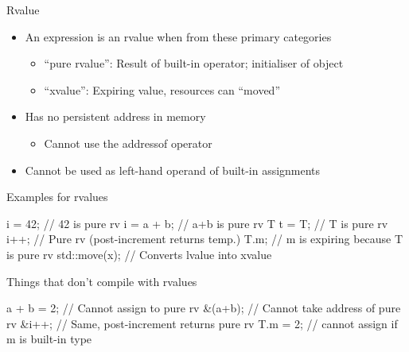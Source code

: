 \begin{frame}[fragile]
  \begin{block}{Rvalue}
    \begin{itemize}
      \item An expression is an rvalue when from these primary categories
      \begin{itemize}
        \item ``pure rvalue'': Result of built-in operator; initialiser of object
        \item ``xvalue'': Expiring value, resources can ``moved''
      \end{itemize}
      \item Has no persistent address in memory
      \begin{itemize}
        \item Cannot use the addressof operator
      \end{itemize}
      \item Cannot be used as left-hand operand of built-in assignments

    \end{itemize}
  \end{block}
  \vspace{-6mm}
  \begin{overprint}
    \begin{exampleblock}{Examples for rvalues}
      \begin{cppcode*}{}
        i = 42;    // 42 is pure rv
        i = a + b; // a+b is pure rv
        T t = T{}; // T{} is pure rv
        i++;       // Pure rv (post-increment returns temp.)
        T{}.m;     // m is expiring because T{} is pure rv
        std::move(x); // Converts lvalue into xvalue
      \end{cppcode*}
    \end{exampleblock}
    \begin{alertblock}{Things that don't compile with rvalues}
      \begin{cppcode*}{}
        a + b = 2; // Cannot assign to pure rv
        &(a+b);    // Cannot take address of pure rv
        &i++;      // Same, post-increment returns pure rv
        T{}.m = 2; // cannot assign if m is built-in type
      \end{cppcode*}
    \end{alertblock}
  \end{overprint}
\end{frame}

